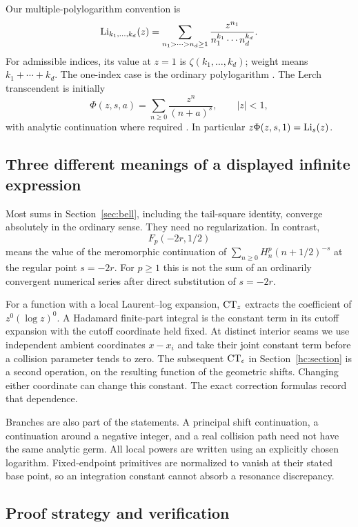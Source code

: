 Our multiple-polylogarithm convention is
\[
 \operatorname{Li}_{k_1,\ldots,k_d}(z)=
 \sum_{n_1>\cdots>n_d\ge1}
       \frac{z^{n_1}}{n_1^{k_1}\cdots n_d^{k_d}}.
\]
For admissible indices, its value at $z=1$ is
$\zeta(k_1,\ldots,k_d)$; weight means $k_1+\cdots+k_d$.
The one-index case is the ordinary polylogarithm
\cite{DLMFPolylog}. The Lerch transcendent is initially
\[
 \Phi(z,s,a)=\sum_{n\ge0}\frac{z^n}{(n+a)^s},\qquad |z|<1,
\]
with analytic continuation where required
\cite{DLMFLerch}. In particular $z\Phi(z,s,1)=\operatorname{Li}_s(z)$.

\subsection{Three different meanings of a displayed infinite expression}

Most sums in Section~\ref{sec:bell}, including the tail-square
identity, converge absolutely in the ordinary sense. They need no
regularization. In contrast,
\[
 F_p(-2r,1/2)
\]
means the value of the meromorphic continuation of
$\sum_{n\ge0}H_n^p(n+1/2)^{-s}$ at the regular point $s=-2r$.
For $p\ge1$ this is not the sum of an ordinarily convergent numerical
series after direct substitution of $s=-2r$.

For a function with a local Laurent--log expansion, $\operatorname{CT}_z$ extracts
the coefficient of $z^0(\log z)^0$. A Hadamard finite-part integral
is the constant term in its cutoff expansion with the cutoff coordinate
held fixed. At distinct interior seams we use independent ambient
coordinates $x-x_i$ and take their joint constant term before a
collision parameter tends to zero. The subsequent $\operatorname{CT}_\epsilon$
in Section~\ref{hc:section} is a second operation, on the resulting
function of the geometric shifts. Changing either coordinate can
change this constant. The exact correction formulas record that
dependence.

Branches are also part of the statements. A principal shift
continuation, a continuation around a negative integer, and a real
collision path need not have the same analytic germ. All local powers
are written using an explicitly chosen logarithm. Fixed-endpoint
primitives are normalized to vanish at their stated base point, so
an integration constant cannot absorb a resonance discrepancy.

\subsection{Proof strategy and verification}

